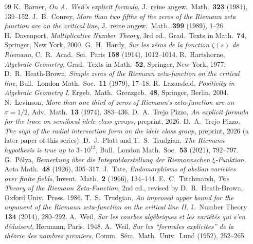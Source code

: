 \documentclass[11pt]{amsart}
\theoremstyle{definition}
\theoremstyle{remark}
\begin{document}
\begin{thebibliography}{99}
 K.~Barner, \emph{On A.~Weil's explicit formula}, J.~reine angew.\ Math.\ \textbf{323} (1981), 139--152.
 J.~B.~Conrey, \emph{More than two fifths of the zeros of the Riemann zeta function are on the critical line},
J.~reine angew.\ Math.\ \textbf{399} (1989), 1--26.
 H.~Davenport, \emph{Multiplicative Number Theory}, 3rd ed., Grad.\ Texts in Math.\ \textbf{74}, Springer, New York, 2000.
 G.~H.~Hardy, \emph{Sur les z\'eros de la fonction $\zeta(s)$ de Riemann}, C.~R.~Acad.\ Sci.\ Paris \textbf{158} (1914), 1012--1014.
 R.~Hartshorne, \emph{Algebraic Geometry}, Grad.\ Texts in Math.\ \textbf{52}, Springer, New York, 1977.
 D.~R.~Heath-Brown, \emph{Simple zeros of the Riemann zeta-function on the critical line}, Bull.\ London Math.\ Soc.\ \textbf{11} (1979), 17--18.
 R.~Lazarsfeld, \emph{Positivity in Algebraic Geometry I}, Ergeb.\ Math.\ Grenzgeb.\ \textbf{48}, Springer, Berlin, 2004.
 N.~Levinson, \emph{More than one third of zeros of Riemann's zeta-function are on $\sigma=1/2$}, Adv.\ Math.\ \textbf{13} (1974), 383--436.
 D.~A.~Trejo Pizzo, \emph{An explicit formula for the trace on semilocal idele class groups}, preprint, 2026.
 D.~A.~Trejo Pizzo, \emph{The sign of the radial intersection form on the idele class group}, preprint, 2026 (a later paper of this series).
 D.~J.~Platt and T.~S.~Trudgian, \emph{The Riemann hypothesis is true up to $3\cdot10^{12}$}, Bull.\ London Math.\ Soc.\ \textbf{53} (2021), 792--797.
 G.~P\'olya, \emph{Bemerkung \"uber die Integraldarstellung der Riemannschen $\xi$-Funktion}, Acta Math.\ \textbf{48} (1926), 305--317.
 J.~Tate, \emph{Endomorphisms of abelian varieties over finite fields}, Invent.\ Math.\ \textbf{2} (1966), 134--144.
 E.~C.~Titchmarsh, \emph{The Theory of the Riemann Zeta-Function}, 2nd ed., revised by D.~R.~Heath-Brown, Oxford Univ.\ Press, 1986.
 T.~S.~Trudgian, \emph{An improved upper bound for the argument of the Riemann zeta-function on the critical line II}, J.~Number Theory \textbf{134} (2014), 280--292.
 A.~Weil, \emph{Sur les courbes alg\'ebriques et les vari\'et\'es qui s'en d\'eduisent}, Hermann, Paris, 1948.
 A.~Weil, \emph{Sur les ``formules explicites'' de la th\'eorie des nombres premiers}, Comm.~S\'em.~Math.~Univ.~Lund (1952), 252--265.
\end{thebibliography}
\end{document}
